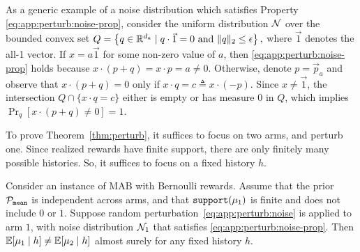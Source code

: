 \begin{remark}
As a generic example of a noise distribution which satisfies
  Property \eqref{eq:app:perturb:noise-prop}, consider the uniform
  distribution $\mathcal{N}$ over the bounded convex set
  $ Q = \left\{q \in \mathbb{R}^{d_a} \mid q \cdot \vec{1} = 0 \mbox{ and }
      \|q\|_2 \leq \epsilon\right\}, $
  where $\vec{1}$ denotes the all-1
  vector. If $x = a \vec{1}$ for some non-zero value of $a$, then
  \eqref{eq:app:perturb:noise-prop} holds because
  $x \cdot (p+q) = x \cdot p = a\neq 0.$
Otherwise, denote
  $p=\vec{p}_a$ and observe that $x\cdot({p}+ {q}) = 0$ only if
  $x \cdot q = c \triangleq x \cdot (-p)$. Since $x\neq \vec{1}$, the
  intersection $Q\cap\{ x\cdot q = c \}$ either is empty or has
  measure 0 in $Q$, which implies
  $\Pr_{{q}}\left[ x\cdot({p}+ {q}) \neq 0 \right] =1$.
\end{remark}


To prove Theorem~\ref{thm:perturb}, it suffices to focus on two arms, and perturb one. Since realized rewards have finite support, there are only finitely many possible histories. So, it suffices to focus on a fixed history $h$.

\begin{lemma}\label{lm:perturb}
Consider an instance of MAB with Bernoulli rewards. Assume that the prior $\mathcal{P}_\mathtt{mean}$ is independent across arms, and that $\mathtt{support}(\mu_1)$ is finite and does not include $0$ or $1$. Suppose random perturbation~\eqref{eq:app:perturb:noise} is applied to arm $1$, with noise distribution $\mathcal{N}_1$ that satisfies \eqref{eq:app:perturb:noise-prop}. Then
    $\E[\mu_1\mid h] \neq \E[\mu_2\mid h] $
almost surely for any fixed history $h$. 
\end{lemma}

